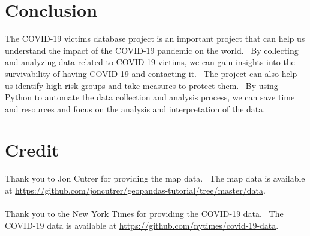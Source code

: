 \documentclass{article}
\begin{document}
\section{Conclusion}
The COVID-19 victims database project is an important project that can help us understand the impact of the COVID-19 pandemic on the world. \
By collecting and analyzing data related to COVID-19 victims, we can gain insights into the survivability of having COVID-19 and contacting it. \
The project can also help us identify high-risk groups and take measures to protect them. \
By using Python to automate the data collection and analysis process, we can save time and resources and focus on the analysis and interpretation of the data.

\section{Credit}
Thank you to Jon Cutrer for providing the map data. \
The map data is available at \url{https://github.com/joncutrer/geopandas-tutorial/tree/master/data}.
\\\\
Thank you to the New York Times for providing the COVID-19 data. \
The COVID-19 data is available at \url{https://github.com/nytimes/covid-19-data}.
\end{document}
